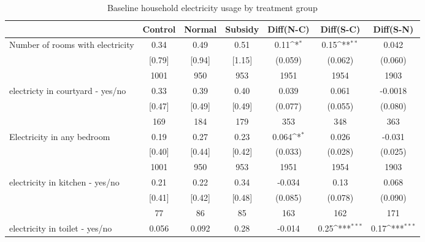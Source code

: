 \begin{table}[htbp]\centering
\def\sym#1{\ifmmode^{#1}\else\(^{#1}\)\fi}
\caption{Baseline household electricity usage by treatment group \label{tab:"balance"}}
\begin{tabular*}{1\hsize}{@{\hskip\tabcolsep\extracolsep\fill}l*{1}{cccccc}}
\toprule
                                &  Control&   Normal&  Subsidy&Diff(N-C)         &Diff(S-C)         &Diff(S-N)         \\
\midrule
Number of rooms with electricity&     0.34&     0.49&     0.51&     0.11\sym{*}  &     0.15\sym{**} &    0.042         \\
                                &   [0.79]&   [0.94]&   [1.15]&  (0.059)         &  (0.062)         &  (0.060)         \\
                                &     1001&      950&      953&     1951         &     1954         &     1903         \\
electricty in courtyard - yes/no&     0.33&     0.39&     0.40&    0.039         &    0.061         &  -0.0018         \\
                                &   [0.47]&   [0.49]&   [0.49]&  (0.077)         &  (0.055)         &  (0.080)         \\
                                &      169&      184&      179&      353         &      348         &      363         \\
Electricity in any bedroom      &     0.19&     0.27&     0.23&    0.064\sym{*}  &    0.026         &   -0.031         \\
                                &   [0.40]&   [0.44]&   [0.42]&  (0.033)         &  (0.028)         &  (0.025)         \\
                                &     1001&      950&      953&     1951         &     1954         &     1903         \\
electricity in kitchen - yes/no &     0.21&     0.22&     0.34&   -0.034         &     0.13         &    0.068         \\
                                &   [0.41]&   [0.42]&   [0.48]&  (0.085)         &  (0.078)         &  (0.090)         \\
                                &       77&       86&       85&      163         &      162         &      171         \\
electricity in toilet - yes/no  &    0.056&    0.092&     0.28&   -0.014         &     0.25\sym{***}&     0.17\sym{***}\\

\end{tabular*}
\end{table}
